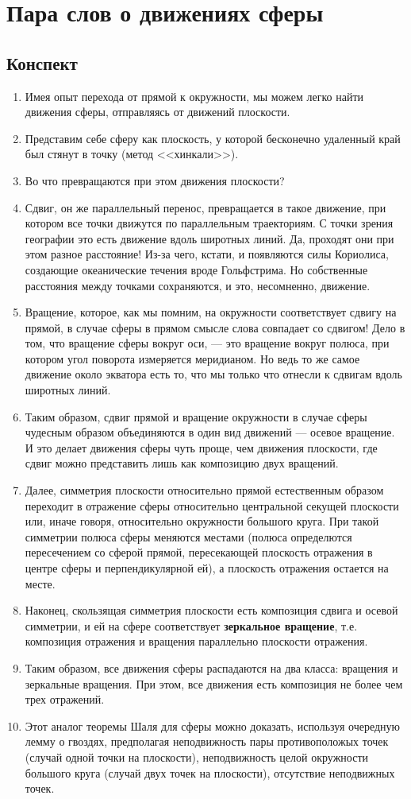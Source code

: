 \section{Пара слов о движениях сферы}
\subsection*{Конспект}
\begin{enumerate}
\item Имея опыт перехода от прямой к окружности, мы можем легко найти движения сферы, отправляясь от движений плоскости.
\item Представим себе сферу как плоскость, у которой бесконечно удаленный край был стянут в точку (метод <<хинкали>>).
\item Во что превращаются при этом движения плоскости?
\item Сдвиг, он же параллельный перенос, превращается в такое движение, при котором все точки движутся по параллельным траекториям. С точки зрения географии это есть движение вдоль широтных линий. Да, проходят они при этом разное расстояние! Из-за чего, кстати, и появляются силы Кориолиса, создающие океанические течения вроде Гольфстрима. Но собственные расстояния между точками сохраняются, и это, несомненно, движение.
\item Вращение, которое, как мы помним, на окружности соответствует сдвигу на прямой, в случае сферы в прямом смысле слова совпадает со сдвигом! Дело в том, что вращение сферы вокруг оси, --- это вращение вокруг полюса, при котором угол поворота измеряется меридианом. Но ведь то же самое движение около экватора есть то, что мы только что отнесли к сдвигам вдоль широтных линий.
\item Таким образом, сдвиг прямой и вращение окружности в случае сферы чудесным образом объединяются в один вид движений --- осевое вращение. И это делает движения сферы чуть проще, чем движения плоскости, где сдвиг можно представить лишь как композицию двух вращений.
\item Далее, симметрия плоскости относительно прямой естественным образом переходит в отражение сферы относительно центральной секущей плоскости или, иначе говоря, относительно окружности большого круга. При такой симметрии полюса сферы меняются местами (полюса определются пересечением со сферой прямой, пересекающей плоскость отражения в центре сферы и перпендикулярной ей), а плоскость отражения остается на месте.
\item Наконец, скользящая симметрия плоскости есть композиция сдвига и осевой симметрии, и ей на сфере соответствует \textbf{зеркальное вращение}, т.е. композиция отражения и вращения параллельно плоскости отражения.
\item Таким образом, все движения сферы распадаются на два класса: вращения и зеркальные вращения. При этом, все движения есть композиция не более чем трех отражений.
\item Этот аналог теоремы Шаля для сферы можно доказать, используя очередную лемму о гвоздях, предполагая неподвижность пары противоположых точек (случай одной точки на плоскости), неподвижность целой окружности большого круга (случай двух точек на плоскости), отсутствие неподвижных точек.
\end{enumerate}

